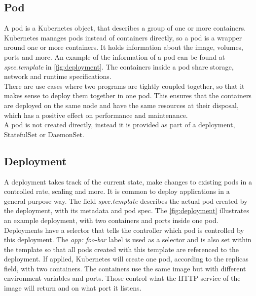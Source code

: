 \subsection{Pod}
A pod is a Kubernetes object, that describes a group of one or more containers.
Kubernetes manages pods instead of containers directly, so a pod is a wrapper around one or more containers.
It holds information about the image, volumes, ports and more.
An example of the information of a pod can be found at \textit{spec.template} in \autoref{fig:deployment}.
The containers inside a pod share storage, network and runtime specifications.
\\
There are use cases where two programs are tightly coupled together, so that it makes sense to deploy them together in one pod.
This ensures that the containers are deployed on the same node and have the same resources at their disposal, which has a positive effect on performance and maintenance.
\\
A pod is not created directly, instead it is provided as part of a deployment, StatefulSet or DaemonSet.~\cite{KUBERNETES-POD}

\subsection{Deployment}\label{subsec:deployment}

A deployment takes track of the current state, make changes to existing pods in a controlled rate, scaling and more.
It is common to deploy applications in a general purpose way.
The field \textit{spec.template} describes the actual pod created by the deployment, with its metadata and pod spec.
The \autoref{fig:deployment} illustrates an example deployment, with two containers and ports inside one pod.
Deployments have a selector that tells the controller which pod is controlled by this deployment.
The \textit{app: foo-bar} label is used as a selector and is also set within the template so that all pods created with this template are referenced to the deployment.
If applied, Kubernetes will create one pod, according to the replicas field, with two containers.
The containers use the same image but with different environment variables and ports.
Those control what the HTTP service of the image will return and on what port it listens.~\cite{KUBERNETES-DEPLOYMENT}

